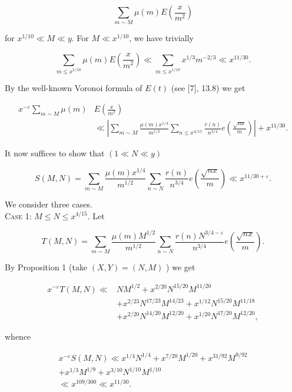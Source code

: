 \documentclass[10pt]{article}
\begin{document}
$$
\sum_{m \sim M} \mu(m) E\left(\frac{x}{m^{2}}\right)
$$

for $x^{1 / 10} \ll M \ll y$. For $M \ll x^{1 / 10}$, we have trivially


\begin{equation*}
\sum_{m \leq x^{1 / 10}} \mu(m) E\left(\frac{x}{m^{2}}\right) \ll \sum_{m \leq x^{1 / 10}} x^{1 / 3} m^{-2 / 3} \ll x^{11 / 30} . \tag{4.1}
\end{equation*}


By the well-known Voronoi formula of $E(t)$ (see [7], 13.8) we get


\begin{align*}
x^{-\varepsilon} \sum_{m \sim M} \mu(m) & E\left(\frac{x}{m^{2}}\right)  \tag{4.2}\\
& \ll\left|\sum_{m \sim M} \frac{\mu(m) x^{1 / 4}}{m^{1 / 2}} \sum_{n \leq x^{4 / 15}} \frac{r(n)}{n^{3 / 4}} e\left(\frac{\sqrt{n x}}{m}\right)\right|+x^{11 / 30}.
\end{align*}


It now suffices to show that $(1 \ll N \ll y)$


\begin{equation*}
S(M, N)=\sum_{m \sim M} \frac{\mu(m) x^{1 / 4}}{m^{1 / 2}} \sum_{n \sim N} \frac{r(n)}{n^{3 / 4}} e\left(\frac{\sqrt{n x}}{m}\right) \ll x^{11 / 30+\varepsilon} . \tag{4.3}
\end{equation*}


We consider three cases.\\
\medskip\noindent\textsc{Case 1:} $M \leq N \leq x^{4 / 15}$. Let

$$
T(M, N)=\sum_{m \sim M} \frac{\mu(m) M^{1 / 2}}{m^{1 / 2}} \sum_{n \sim N} \frac{r(n) N^{3 / 4-\varepsilon}}{n^{3 / 4}} e\left(\frac{\sqrt{n x}}{m}\right).
$$

By Proposition 1 (take $(X, Y)=(N, M)$ ) we get


\begin{align*}
x^{-\varepsilon} T(M, N) \ll & N M^{1 / 2}+x^{2 / 20} N^{15 / 20} M^{11 / 20}  \tag{4.4}\\
& +x^{2 / 23} N^{17 / 23} M^{14 / 23}+x^{1 / 12} N^{15 / 20} M^{11 / 18} \\
& +x^{2 / 20} N^{14 / 20} M^{12 / 20}+x^{1 / 20} N^{17 / 20} M^{12 / 20},
\end{align*}


whence


\begin{gather*}
x^{-\varepsilon} S(M, N) \ll x^{1 / 4} N^{1 / 4}+x^{7 / 20} M^{1 / 20}+x^{31 / 92} M^{9 / 92}  \tag{4.5}\\
+x^{1 / 3} M^{1 / 9}+x^{3 / 10} N^{1 / 10} M^{1 / 10} \\
\ll x^{109 / 300} \ll x^{11 / 30}.
\end{gather*}
\end{document}
